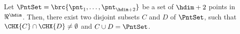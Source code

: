\begin{theorem}
    Let $\PntSet = \brc{\pnt_1, \ldots, \pnt_{\hdim+2}}$ be a set of
    $\hdim+2$ points in $\Re^\hdim$. Then, there exist two disjoint
    subsets $C$ and $D$ of $\PntSet$, such that $\CHX{C} \cap \CHX{D}
    \ne \emptyset$ and $C \cup D = \PntSet$. %
\end{theorem}
